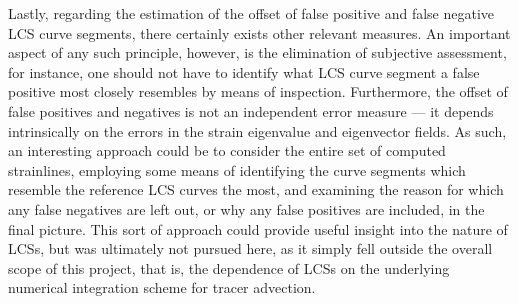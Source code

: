 Lastly, regarding the estimation of the offset of false positive and false
negative LCS curve segments, there certainly exists other relevant measures.
An important aspect of any such principle, however, is the elimination of
subjective assessment, for instance, one should not have to identify
what LCS curve segment a false positive most closely resembles by means of
inspection. Furthermore, the offset of false positives and negatives is not
an independent error measure --- it depends intrinsically on the errors
in the strain eigenvalue and eigenvector fields. As such, an interesting
approach could be to consider the entire set of computed strainlines, employing
some means of identifying the curve segments which resemble the reference
LCS curves the most, and examining the reason for which any false negatives
are left out, or why any false positives are included, in the final picture.
This sort of approach could provide useful insight into the nature of LCSs, but
was ultimately not pursued here, as it simply fell outside the
overall scope of this project, that is, the dependence of LCSs on the
underlying numerical integration scheme for tracer advection.


